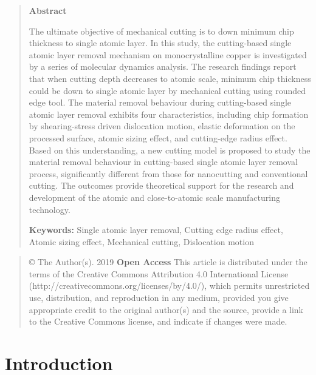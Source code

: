 \documentclass{article}
\begin{document}
\begin{quote}
\noindent\textbf{Abstract}\par
\noindent The ultimate objective of mechanical cutting is to down minimum chip thickness to single atomic layer. In this study, the cutting-based single atomic layer removal mechanism on monocrystalline copper is investigated by a series of molecular dynamics analysis. The research findings report that when cutting depth decreases to atomic scale, minimum chip thickness could be down to single atomic layer by mechanical cutting using rounded edge tool. The material removal behaviour during cutting-based single atomic layer removal exhibits four characteristics, including chip formation by shearing-stress driven dislocation motion, elastic deformation on the processed surface, atomic sizing effect, and cutting-edge radius effect. Based on this understanding, a new cutting model is proposed to study the material removal behaviour in cutting-based single atomic layer removal process, significantly different from those for nanocutting and conventional cutting. The outcomes provide theoretical support for the research and development of the atomic and close-to-atomic scale manufacturing technology.

\noindent\textbf{Keywords:} Single atomic layer removal, Cutting edge radius effect, Atomic sizing effect, Mechanical cutting, Dislocation motion
\end{quote}

\begin{quote}\small
\noindent © The Author(s). 2019 \textbf{Open Access} This article is distributed under the terms of the Creative Commons Attribution 4.0 International License (http://creativecommons.org/licenses/by/4.0/), which permits unrestricted use, distribution, and reproduction in any medium, provided you give appropriate credit to the original author(s) and the source, provide a link to the Creative Commons license, and indicate if changes were made.
\end{quote}

\section*{Introduction}
\end{document}

